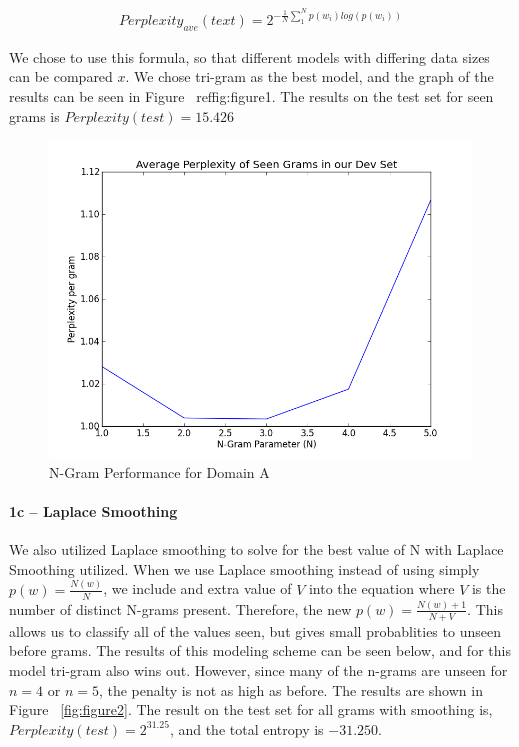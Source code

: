 \documentclass[paper=a4, fontsize=11pt]{scrartcl} %
\begin{document}
\begin{align}
Perplexity_{ave}(text) = 2^{-\frac{1}{N}\sum_1^N p(w_i)log(p(w_i))}
\end{align}

We chose to use this formula, so that different models with differing data sizes can be compared $x$.
We chose tri-gram as the best model, and the graph of the results can be seen in Figure ~ref{fig:figure1}.  The results on the test set for seen grams is $Perplexity(test)=15.426$

\begin{figure}
\centering
\includegraphics[scale=0.4]{figure_1.png}
\caption{N-Gram Performance for Domain A}
\label{fig:figure1}
\end{figure}

\paragraph{1c -- Laplace Smoothing}
We also utilized Laplace smoothing to solve for the best value of N with Laplace Smoothing utilized.  When we use Laplace smoothing instead of using simply $p(w)=\frac{N(w)}{N}$, we include and extra value of $V$ into the equation where $V$ is the number of distinct N-grams present.  Therefore, the new $p(w) = \frac{N(w)+1}{N+V}$.  This allows us to classify all of the values seen, but gives small probablities to unseen before grams.  The results of this modeling scheme can be seen below, and for this model tri-gram also wins out.  
However, since many of the n-grams are unseen for $n=4$ or $n=5$, the penalty is not as high as before.  The results are shown in Figure ~\ref{fig:figure2}.  
The result on the test set for all grams with smoothing is,  $Perplexity(test)=2^{31.25}$, and the total entropy is $-31.250$.
\end{document}
